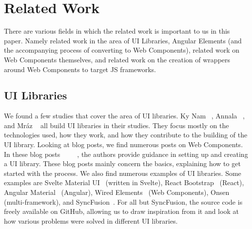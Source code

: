\chapter{Related Work}\label{chap:related-work}

There are various fields in which the related work is important to us in this paper. Namely related work in the area of UI Libraries, Angular Elements (and the accompanying process of converting to Web Components), related work on Web Components themselves, and related work on the creation of wrappers around Web Components to target JS frameworks.

\section{UI Libraries}
We found a few studies that cover the area of UI libraries. Ky Nam \etal{}~\cite{ky2019ui}, Annala \etal{}~\cite{annala2017documentation}, and Mráz \etal{}~\cite{mrazcomponent} all build UI libraries in their studies. They focus mostly on the technologies used, how they work, and how they contribute to the building of the UI library. Looking at blog posts, we find numerous posts on Web Components. In these blog posts~~~~~, the authors provide guidance in setting up and creating a UI library. These blog posts mainly concern the basics, explaining how to get started with the process. We also find numerous examples of UI libraries. Some examples are Svelte Material UI~ (written in Svelte), React Bootstrap~ (React), Angular Material~ (Angular), Wired Elements~ (Web Components), Onsen~ (multi-framework), and SyncFusion~. For all but SyncFusion, the source code is freely available on GitHub, allowing us to draw inspiration from it and look at how various problems were solved in different UI libraries.

